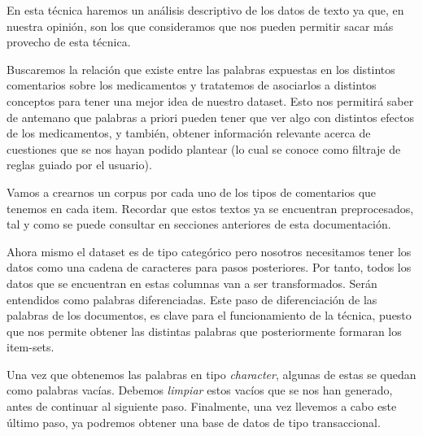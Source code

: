 \documentclass[spanish,]{article}
\newenvironment{Shaded}{\begin{snugshade}}{\end{snugshade}}
\newcommand{\KeywordTok}[1]{\textcolor[rgb]{0.13,0.29,0.53}{\textbf{#1}}}
\newcommand{\StringTok}[1]{\textcolor[rgb]{0.31,0.60,0.02}{#1}}
\newcommand{\OperatorTok}[1]{\textcolor[rgb]{0.81,0.36,0.00}{\textbf{#1}}}
\newcommand{\NormalTok}[1]{#1}
\begin{document}
En esta técnica haremos un análisis descriptivo de los datos de texto ya
que, en nuestra opinión, son los que consideramos que nos pueden
permitir sacar más provecho de esta técnica.

Buscaremos la relación que existe entre las palabras expuestas en los
distintos comentarios sobre los medicamentos y tratatemos de asociarlos
a distintos conceptos para tener una mejor idea de nuestro dataset. Esto
nos permitirá saber de antemano que palabras a priori pueden tener que
ver algo con distintos efectos de los medicamentos, y también, obtener
información relevante acerca de cuestiones que se nos hayan podido
plantear (lo cual se conoce como filtraje de reglas guiado por el
usuario).

Vamos a crearnos un corpus por cada uno de los tipos de comentarios que
tenemos en cada item. Recordar que estos textos ya se encuentran
preprocesados, tal y como se puede consultar en secciones anteriores de
esta documentación.

\begin{Shaded}
\end{Shaded}

Ahora mismo el dataset es de tipo categórico pero nosotros necesitamos
tener los datos como una cadena de caracteres para pasos posteriores.
Por tanto, todos los datos que se encuentran en estas columnas van a ser
transformados. Serán entendidos como palabras diferenciadas. Este paso
de diferenciación de las palabras de los documentos, es clave para el
funcionamiento de la técnica, puesto que nos permite obtener las
distintas palabras que posteriormente formaran los item-sets.

Una vez que obtenemos las palabras en tipo \emph{character}, algunas de
estas se quedan como palabras vacías. Debemos \emph{limpiar} estos
vacíos que se nos han generado, antes de continuar al siguiente paso.
Finalmente, una vez llevemos a cabo este último paso, ya podremos
obtener una base de datos de tipo transaccional.
\end{document}
